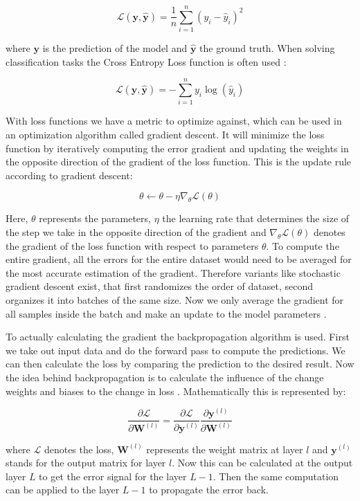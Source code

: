 \documentclass[twoside,a4paper,10pt,DIV=12,BCOR=12mm]{scrartcl}
\begin{document}
$$\mathcal{L}(\mathbf{y},\mathbf{\hat{y}}) = \frac{1}{n}\sum^n_{i=1}{(y_i-\hat{y}_i)^2}$$

where $\mathbf{y}$ is the prediction of the model and $\mathbf{\hat{y}}$ the ground truth. When solving classification tasks the Cross Entropy Loss function is often used \cite{Goodfellow16}:


$$\mathcal{L}(\mathbf{y},\mathbf{\hat{y}}) = -\sum^n_{i=1}{y_i\log(\hat{y}_i)}$$

With loss functions we have a metric to optimize against, which can be used in an optimization algorithm called 
gradient descent. It will minimize the loss function by iteratively computing the error gradient and updating
the weights in the opposite direction of the gradient of the loss function. This is the update rule according
to gradient descent: \cite{Bottou10, Goodfellow16}

$$ \theta \leftarrow \theta - \eta \nabla_{\theta}\mathcal{L}(\theta)$$

Here, $\theta$ represents the parameters, $\eta$ the learning rate that determines the size of the step we take in 
the opposite direction of the gradient and $\nabla_{\theta}\mathcal{L}(\theta)$ denotes the gradient 
of the loss function with respect to parameters $\theta$. To compute the entire gradient, all the errors for the 
entire dataset would need to be averaged for the most accurate estimation of the gradient. Therefore variants 
like stochastic gradient descent exist, that first randomizes the order of dataset, second organizes it into batches of
the same size. Now we only average the gradient for all samples inside the batch and make an update to the model parameters \cite{Bottou10}.


To actually calculating the gradient the backpropagation algorithm is used. First we take out input data and do the
forward pass to compute the predictions. We can then calculate the loss by comparing the prediction to the desired result.
Now the idea behind backpropagation is to calculate the influence of the change weights and biases to the change in loss \cite{Rumelhart86}.
Mathematically this is represented by:


$$
\frac{\partial \mathcal{L}}{\partial \mathbf{W}^{(l)}} = \frac{\partial \mathcal{L}}{\partial \mathbf{y}^{(l)}} \frac{\partial \mathbf{y}^{(l)}}{\partial \mathbf{W}^{(l)}}
$$


where $\mathcal{L}$ denotes the loss, $\mathbf{W}^{(l)}$ represents the weight matrix at layer $l$ and $\mathbf{y}^{(l)}$ stands for the output matrix
for layer $l$. Now this can be calculated at the output layer $L$ to get the error signal for the layer $L-1$. 
Then the same computation can be applied to the layer $L-1$ to propagate the error back.
\end{document}
